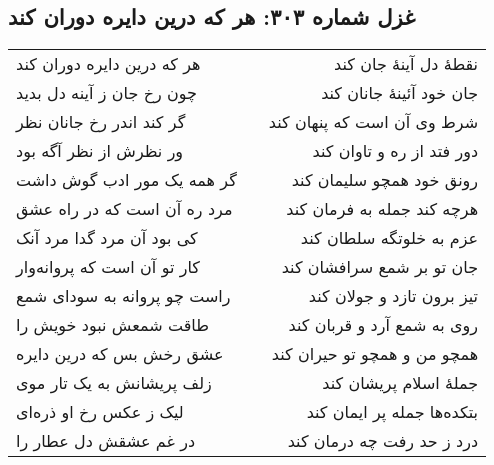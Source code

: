 \begin{center}
\section*{غزل شماره ۳۰۳: هر که درین دایره دوران کند}
\label{sec:303}
\begin{longtable}{l p{0.5cm} r}
هر که درین دایره دوران کند
&&
نقطهٔ دل آینهٔ جان کند
\\
چون رخ جان ز آینه دل بدید
&&
جان خود آئینهٔ جانان کند
\\
گر کند اندر رخ جانان نظر
&&
شرط وی آن است که پنهان کند
\\
ور نظرش از نظر آگه بود
&&
دور فتد از ره و تاوان کند
\\
گر همه یک مور ادب گوش داشت
&&
رونق خود همچو سلیمان کند
\\
مرد ره آن است که در راه عشق
&&
هرچه کند جمله به فرمان کند
\\
کی بود آن مرد گدا مرد آنک
&&
عزم به خلوتگه سلطان کند
\\
کار تو آن است که پروانه‌وار
&&
جان تو بر شمع سرافشان کند
\\
راست چو پروانه به سودای شمع
&&
تیز برون تازد و جولان کند
\\
طاقت شمعش نبود خویش را
&&
روی به شمع آرد و قربان کند
\\
عشق رخش بس که درین دایره
&&
همچو من و همچو تو حیران کند
\\
زلف پریشانش به یک تار موی
&&
جملهٔ اسلام پریشان کند
\\
لیک ز عکس رخ او ذره‌ای
&&
بتکده‌ها جمله پر ایمان کند
\\
در غم عشقش دل عطار را
&&
درد ز حد رفت چه درمان کند
\\
\end{longtable}
\end{center}
